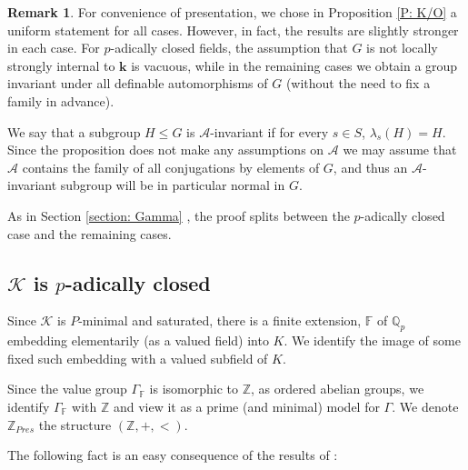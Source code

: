 \documentclass[11pt]{amsart}
\theoremstyle{definition}
\newtheorem{remark}[theorem]{Remark}
\newcommand{\CA}{\mathcal A}
\newcommand{\Zz}{{\mathbb {Z}}}
\newcommand{\bk}{\textbf{k}}
\newcommand{\CK}{{\mathcal K}}
\newcommand{\0}{\emptyset}
\def\qp{\mathbb Q_p}
\begin{document}
\begin{remark}
    For convenience of presentation, we chose in Proposition \ref{P: K/O} a uniform statement for all cases. However, in fact, the results are slightly stronger in each case. For $p$-adically closed fields, the assumption that $G$ is not locally strongly internal to $\bk$ is vacuous, while in the remaining cases we obtain a group invariant under all definable automorphisms of $G$ (without the need to fix a family in advance).
\end{remark} 


We say that a subgroup $H\leq G$ is $\CA$-invariant if for every $s\in S$, $\lambda_s(H)=H$. Since the proposition does not make any assumptions on $\CA$ we may assume that $\CA$ contains the family of all conjugations by elements of $G$, and thus an $\CA$-invariant subgroup will be in particular normal in $G$. 

As in Section \ref{section: Gamma} , the proof splits between the $p$-adically closed case and the remaining cases.


\subsection{$\CK$ is $p$-adically closed}
Since $\CK$ is $P$-minimal and saturated, there is a finite extension, $\mathbb F$ of $\qp$ embedding elementarily (as a valued field) into $K$. We identify the image of some fixed such embedding with a valued subfield of $K$. 

Since the value group $\Gamma_{\mathbb{F}}$ is isomorphic to $\mathbb{Z}$, as ordered abelian groups,  we identify $\Gamma_{\mathbb{F}}$ with $\mathbb{Z}$ and view it as a prime (and minimal) model for $\Gamma$. We denote $\Zz_{Pres}$ the structure $(\Zz, +, <)$.


The following fact is an easy consequence of the results of \cite{HaHaPeGps}:
\end{document}
